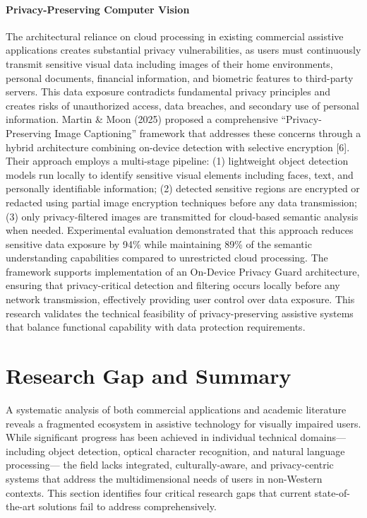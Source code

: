 \documentclass[12pt,a4paper]{report}
\begin{document}
\paragraph*{Privacy-Preserving Computer Vision}

The architectural reliance on cloud processing in existing commercial assistive applications creates substantial privacy vulnerabilities, as users must continuously transmit sensitive visual data including images of their home environments, personal documents, financial information, and biometric features to third-party servers. This data exposure contradicts fundamental privacy principles and creates risks of unauthorized access, data breaches, and secondary use of personal information. Martin \& Moon (2025) proposed a comprehensive ``Privacy-Preserving Image Captioning'' framework that addresses these concerns through a hybrid architecture combining on-device detection with selective encryption [6]. Their approach employs a multi-stage pipeline: (1) lightweight object detection models run locally to identify sensitive visual elements including faces, text, and personally identifiable information; (2) detected sensitive regions are encrypted or redacted using partial image encryption techniques before any data transmission; (3) only privacy-filtered images are transmitted for cloud-based semantic analysis when needed. Experimental evaluation demonstrated that this approach reduces sensitive data exposure by 94\% while maintaining 89\% of the semantic understanding capabilities compared to unrestricted cloud processing. The framework supports implementation of an On-Device Privacy Guard architecture, ensuring that privacy-critical detection and filtering occurs locally before any network transmission, effectively providing user control over data exposure. This research validates the technical feasibility of privacy-preserving assistive systems that balance functional capability with data protection requirements.

\section{Research Gap and Summary}

A systematic analysis of both commercial applications and academic literature reveals a fragmented ecosystem in assistive technology for visually impaired users. While significant progress has been achieved in individual technical domains---including object detection, optical character recognition, and natural language processing--- the field lacks integrated, culturally-aware, and privacy-centric systems that address the multidimensional needs of users in non-Western contexts. This section identifies four critical research gaps that current state-of-the-art solutions fail to address comprehensively.
\end{document}
